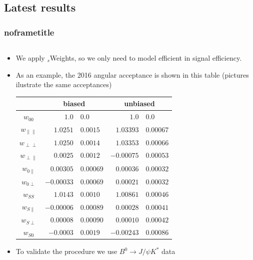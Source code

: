 \documentclass[aspectratio=169,9pt,handout]{beamer}
\begin{document}
\subsection*{Latest results}
\begin{frame}[default] %
\frametitle{noframetitle}

  \begin{columns}
    \begin{column}{0.55\textwidth}
      \begin{itemize}
        \item We apply ${}_s$Weights, so we only need to model efficient in signal efficiency.
        \item As an example, the 2016 angular acceptance is shown in this table (pictures ilustrate the same acceptances)
        \begin{tabular}{c|r@{$\pm$}l|r@{$\pm$}l}
          & \multicolumn{2}{c|}{biased} & \multicolumn{2}{c}{unbiased} \\ \hline
          $ w_{00} $&$      1.0 $&$ 0.0       $&$      1.0 $&$ 0.0      $  \\
          $ w_{\parallel \parallel} $&$   1.0251 $&$  0.0015 $&$  1.03393 $&$ 0.00067$  \\
          $ w_{\perp \perp} $&$   1.0250 $&$  0.0014 $&$  1.03353 $&$ 0.00066$  \\
          $ w_{\perp \parallel} $&$   0.0025 $&$  0.0012 $&$ -0.00075 $&$ 0.00053$  \\
          $ w_{0 \parallel} $&$  0.00305 $&$ 0.00069 $&$  0.00036 $&$ 0.00032$  \\
          $ w_{0 \perp} $&$ -0.00033 $&$ 0.00069 $&$  0.00021 $&$ 0.00032$  \\
          $ w_{SS} $&$   1.0143 $&$  0.0010 $&$  1.00861 $&$ 0.00046$  \\
          $ w_{S\parallel} $&$ -0.00006 $&$ 0.00089 $&$  0.00028 $&$ 0.00041$  \\
          $ w_{S\perp} $&$  0.00008 $&$ 0.00090 $&$  0.00010 $&$ 0.00042$  \\
          $ w_{S0} $&$  -0.0003 $&$  0.0019 $&$ -0.00243 $&$ 0.00086$  \\
        \end{tabular}
        \item To validate the procedure we use $B^0 \rightarrow J/\psi K^* $ data
      \end{itemize} 
    \end{column}


\end{columns}
\end{frame}
\end{document}
